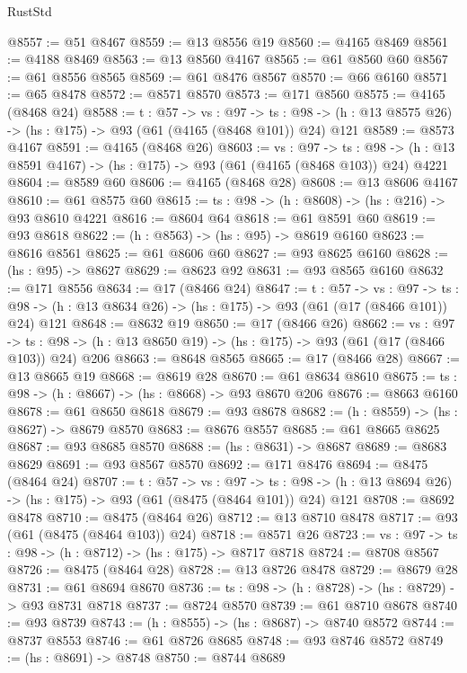 \begin{lexlean}{RustStd}
\begin{coremodule}
@8557 := @51 @8467
@8559 := @13 @8556 @19
@8560 := @4165 @8469
@8561 := @4188 @8469
@8563 := @13 @8560 @4167
@8565 := @61 @8560 @60
@8567 := @61 @8556 @8565
@8569 := @61 @8476 @8567
@8570 := @66 @6160
@8571 := @65 @8478
@8572 := @8571 @8570
@8573 := @171 @8560
@8575 := @4165 (@8468 @24)
@8588 := {t : @57} ->
  {vs : @97} ->
  {ts : @98} -> (h : @13 @8575 @26) -> (hs : @175) -> @93 (@61 (@4165 (@8468 @101)) @24) @121
@8589 := @8573 @4167
@8591 := @4165 (@8468 @26)
@8603 := {vs : @97} ->
  {ts : @98} -> (h : @13 @8591 @4167) -> (hs : @175) -> @93 (@61 (@4165 (@8468 @103)) @24) @4221
@8604 := @8589 @60
@8606 := @4165 (@8468 @28)
@8608 := @13 @8606 @4167
@8610 := @61 @8575 @60
@8615 := {ts : @98} -> (h : @8608) -> (hs : @216) -> @93 @8610 @4221
@8616 := @8604 @64
@8618 := @61 @8591 @60
@8619 := @93 @8618
@8622 := (h : @8563) -> (hs : @95) -> @8619 @6160
@8623 := @8616 @8561
@8625 := @61 @8606 @60
@8627 := @93 @8625 @6160
@8628 := (hs : @95) -> @8627
@8629 := @8623 @92
@8631 := @93 @8565 @6160
@8632 := @171 @8556
@8634 := @17 (@8466 @24)
@8647 := {t : @57} ->
  {vs : @97} ->
  {ts : @98} -> (h : @13 @8634 @26) -> (hs : @175) -> @93 (@61 (@17 (@8466 @101)) @24) @121
@8648 := @8632 @19
@8650 := @17 (@8466 @26)
@8662 := {vs : @97} ->
  {ts : @98} -> (h : @13 @8650 @19) -> (hs : @175) -> @93 (@61 (@17 (@8466 @103)) @24) @206
@8663 := @8648 @8565
@8665 := @17 (@8466 @28)
@8667 := @13 @8665 @19
@8668 := @8619 @28
@8670 := @61 @8634 @8610
@8675 := {ts : @98} -> (h : @8667) -> (hs : @8668) -> @93 @8670 @206
@8676 := @8663 @6160
@8678 := @61 @8650 @8618
@8679 := @93 @8678
@8682 := (h : @8559) -> (hs : @8627) -> @8679 @8570
@8683 := @8676 @8557
@8685 := @61 @8665 @8625
@8687 := @93 @8685 @8570
@8688 := (hs : @8631) -> @8687
@8689 := @8683 @8629
@8691 := @93 @8567 @8570
@8692 := @171 @8476
@8694 := @8475 (@8464 @24)
@8707 := {t : @57} ->
  {vs : @97} ->
  {ts : @98} -> (h : @13 @8694 @26) -> (hs : @175) -> @93 (@61 (@8475 (@8464 @101)) @24) @121
@8708 := @8692 @8478
@8710 := @8475 (@8464 @26)
@8712 := @13 @8710 @8478
@8717 := @93 (@61 (@8475 (@8464 @103)) @24)
@8718 := @8571 @26
@8723 := {vs : @97} -> {ts : @98} -> (h : @8712) -> (hs : @175) -> @8717 @8718
@8724 := @8708 @8567
@8726 := @8475 (@8464 @28)
@8728 := @13 @8726 @8478
@8729 := @8679 @28
@8731 := @61 @8694 @8670
@8736 := {ts : @98} -> (h : @8728) -> (hs : @8729) -> @93 @8731 @8718
@8737 := @8724 @8570
@8739 := @61 @8710 @8678
@8740 := @93 @8739
@8743 := (h : @8555) -> (hs : @8687) -> @8740 @8572
@8744 := @8737 @8553
@8746 := @61 @8726 @8685
@8748 := @93 @8746 @8572
@8749 := (hs : @8691) -> @8748
@8750 := @8744 @8689

\end{coremodule}
\end{lexlean}
